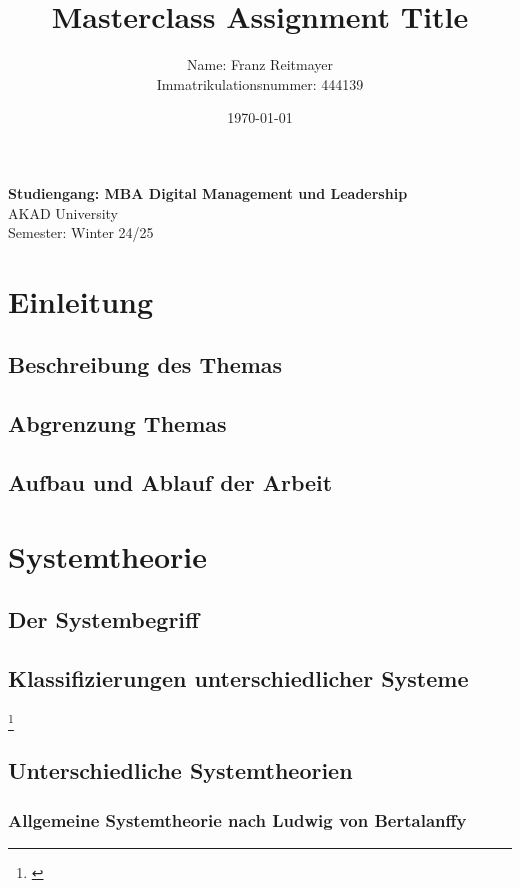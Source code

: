 \documentclass[a4paper,12pt]{article}
\title{Masterclass Assignment Title}
\author{Name: Franz Reitmayer \\ Immatrikulationsnummer: 444139}
\date{\today}
\begin{document}
\maketitle
\vfill
\begin{center}
\textbf{Studiengang: MBA Digital Management und Leadership} \\
AKAD University \\
Semester: Winter 24/25
\end{center}
\vfill
\newpage
\tableofcontents
\newpage


\section{Einleitung}
\subsection{Beschreibung des Themas}
\subsection{Abgrenzung Themas}
\subsection{Aufbau und Ablauf der Arbeit}


\section{Systemtheorie}
\subsection{Der Systembegriff}
\subsection{Klassifizierungen unterschiedlicher Systeme}\footnote{\cite{Ulrich2001}}
\subsection{Unterschiedliche Systemtheorien}
\subsubsection{Allgemeine Systemtheorie nach Ludwig von Bertalanffy}
\end{document}
